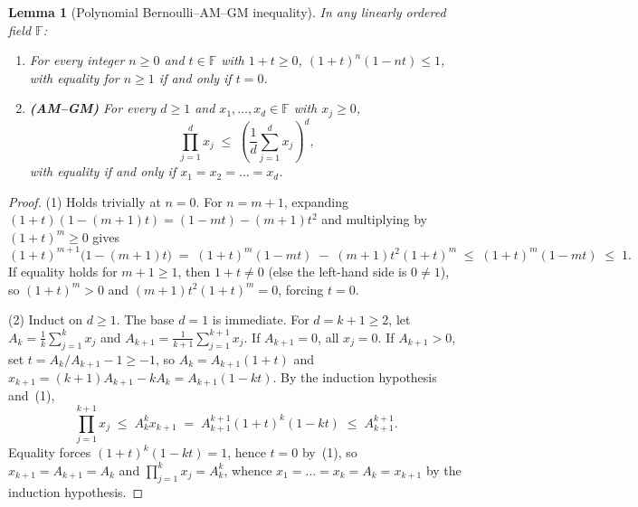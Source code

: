 \documentclass[11pt,a4paper]{article}
\theoremstyle{plain}
\newtheorem{lemma}[theorem]{Lemma}
\theoremstyle{definition}
\begin{document}
\begin{lemma}[Polynomial Bernoulli--AM--GM inequality]
\label{lem:amgm}
In any linearly ordered field $\mathbb{F}$:
\begin{enumerate}
  \item For every integer $n \ge 0$ and $t \in \mathbb{F}$ with $1 + t \ge 0$, $(1 + t)^n (1 - n t) \le 1$, with equality for $n \ge 1$ if and only if $t = 0$.
  \item \textbf{(AM--GM)} For every $d \ge 1$ and $x_1, \dots, x_d \in \mathbb{F}$ with $x_j \ge 0$,
  \[
    \prod_{j=1}^d x_j \;\le\; \left(\frac{1}{d}\sum_{j=1}^d x_j\right)^d,
  \]
  with equality if and only if $x_1 = x_2 = \dots = x_d$.
\end{enumerate}
\end{lemma}
\begin{proof}
(1) Holds trivially at $n = 0$. For $n = m + 1$, expanding $(1 + t)(1 - (m+1)t) = (1 - m t) - (m+1)t^2$ and multiplying by $(1+t)^m \ge 0$ gives
\[
  (1 + t)^{m+1}\bigl(1 - (m+1)t\bigr) \;=\; (1 + t)^m (1 - m t) \;-\; (m + 1) t^2 (1 + t)^m \;\le\; (1 + t)^m (1 - m t) \;\le\; 1.
\]
If equality holds for $m + 1 \ge 1$, then $1 + t \ne 0$ (else the left-hand side is $0 \ne 1$), so $(1+t)^m > 0$ and $(m+1)t^2 (1+t)^m = 0$, forcing $t = 0$.

(2) Induct on $d \ge 1$. The base $d = 1$ is immediate. For $d = k + 1 \ge 2$, let $A_k = \frac{1}{k}\sum_{j=1}^k x_j$ and $A_{k+1} = \frac{1}{k+1}\sum_{j=1}^{k+1} x_j$. If $A_{k+1} = 0$, all $x_j = 0$. If $A_{k+1} > 0$, set $t = A_k / A_{k+1} - 1 \ge -1$, so $A_k = A_{k+1}(1 + t)$ and $x_{k+1} = (k+1)A_{k+1} - k A_k = A_{k+1}(1 - k t)$. By the induction hypothesis and~(1),
\[
  \prod_{j=1}^{k+1} x_j \;\le\; A_k^k x_{k+1} \;=\; A_{k+1}^{k+1} (1 + t)^k (1 - k t) \;\le\; A_{k+1}^{k+1}.
\]
Equality forces $(1 + t)^k (1 - k t) = 1$, hence $t = 0$ by~(1), so $x_{k+1} = A_{k+1} = A_k$ and $\prod_{j=1}^k x_j = A_k^k$, whence $x_1 = \dots = x_k = A_k = x_{k+1}$ by the induction hypothesis.
\end{proof}
\end{document}
